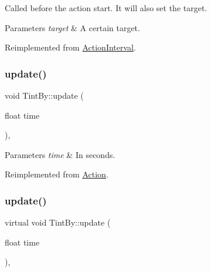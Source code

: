 Called before the action start. It will also set the target.


\begin{DoxyParams}{Parameters}
{\em target} & A certain target. \\
\hline
\end{DoxyParams}


Reimplemented from \hyperlink{classActionInterval_ad3d91186b2c3108488ddbbdbbd982484}{Action\+Interval}.

\mbox{\label{classTintBy_af8e773a8164eed5d22d3ff801d5f6569}} 
\subsubsection{\texorpdfstring{update()}{update()}\hspace{0.1cm}{\footnotesize\ttfamily [1/2]}}
{\footnotesize\ttfamily void Tint\+By\+::update (\begin{DoxyParamCaption}\item[{float}]{time }\end{DoxyParamCaption})\hspace{0.3cm}{\ttfamily [override]}, {\ttfamily [virtual]}}


\begin{DoxyParams}{Parameters}
{\em time} & In seconds. \\
\hline
\end{DoxyParams}


Reimplemented from \hyperlink{classAction_a937e646e63915e33ad05ba149bfcf239}{Action}.

\mbox{\label{classTintBy_aabf7d54981877b1e78b6bbd4cc046b5f}} 
\subsubsection{\texorpdfstring{update()}{update()}\hspace{0.1cm}{\footnotesize\ttfamily [2/2]}}
{\footnotesize\ttfamily virtual void Tint\+By\+::update (\begin{DoxyParamCaption}\item[{float}]{time }\end{DoxyParamCaption})\hspace{0.3cm}{\ttfamily [override]}, {\ttfamily [virtual]}}



